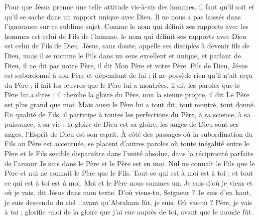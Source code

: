 Pour que Jésus prenne une telle attitude vis-à-vis des hommes, il faut qu’il soit et qu’il se sache dans un rapport unique avec Dieu. Il ne nous a pas laissés dans l’ignorance sur ce sublime sujet. Comme le nom qui définit ses rapports avec les hommes est celui de Fils de l’homme, le nom qui définit ses rapports avec Dieu est celui de Fils de Dieu. Jésus, sans doute, appelle ses disciples à devenir fils de Dieu, mais il se nomme \Og{} le Fils\Fg{} dans un sens excellent et unique, et parlant de Dieu, il ne dit pas \Og{} notre Père\Fg{}, il dit\frcolon{} \Og{} Mon Père et votre Père.\Fg{} Fils de Dieu, Jésus est subordonné à son Père et dépendant de lui ; il ne possède rien qu’il n’ait reçu du Père ; il fait les œuvres que le Père lui a montrées, il dit les paroles que le Père lui a dites ; il cherche la gloire du Père, non la sienne propre, il dit\frcolon{} \Og{} Le Père est plus grand que moi.\Fg{} Mais aussi le Père lui a tout dit, tout montré, tout donné. En qualité de Fils, il participe à toutes les perfections du Père, à sa science, à sa puissance, à sa vie ; la gloire de Dieu est sa gloire, les anges de Dieu sont ses anges, l’Esprit de Dieu est son esprit. À côté des passages où la subordination du Fils au Père est accentuée, se placent d’autres paroles où toute inégalité entre le Père et le Fils semble disparaître dans l’unité absolue, dans la réciprocité parfaite de l’amour\frcolon{} \Og{} Je suis dans le Père et le Père est en moi. Nul ne connaît le Fils que le Père et nul ne connaît le Père que le Fils. Tout ce qui est à moi est à toi ; et tout ce qui est à toi est à moi. Moi et le Père nous sommes un.\Fg{} \ocadr{} \Og{} Je sais d’où je viens et où je vais\Fg{}, dit Jésus dans mon texte. \ocadr{} D’où viens-tu, Seigneur ? \ocadr{} \Og{} Je suis d’en haut, je suis descendu du ciel ; avant qu’Abraham fût, je suis.\Fg{} \ocadr{} Où vas-tu ? \ocadr{} \Og{} Père, je vais à toi ; glorifie -moi de la gloire que j’ai eue auprès de toi, avant que le monde fût.\Fg{}

